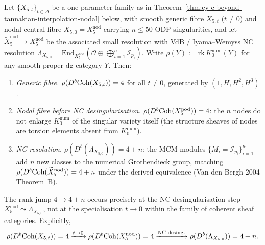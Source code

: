 \begin{proposition}
\label{prop:cy-c-beyond-k0-rank-jump-localisation}
Let $\{X_{5,t}\}_{t \in \Delta}$ be a one-parameter family as in
Theorem~\ref{thm:cy-c-beyond-tannakian-interpolation-nodal} below, with
smooth generic fibre $X_{5,t}$ ($t \neq 0$) and nodal central fibre
$X_{5,0} = X_5^{\mathrm{nod}}$ carrying $n \leq 50$ ODP singularities,
and let $\widetilde X_5^{\mathrm{nod}} \to X_5^{\mathrm{nod}}$ be the
associated small resolution with VdB / Iyama--Wemyss NC resolution
$\Lambda_{X_{5,0}} = \mathrm{End}_{X_5^{\mathrm{nod}}}(\mathcal O \oplus
\bigoplus_{i=1}^n \mathcal I_{p_i})$. Write $\rho(Y) :=
\mathrm{rk}\, K_0^{\mathrm{num}}(Y)$ for any smooth proper dg category
$Y$. Then:
\begin{enumerate}[label=\textup{(\roman*)}]
 \item \emph{Generic fibre.} $\rho(D^b\mathrm{Coh}(X_{5,t})) = 4$ for all
 $t \neq 0$, generated by $(1, H, H^2, H^3)$.
 \item \emph{Nodal fibre before NC desingularisation.}
 $\rho(D^b\mathrm{Coh}(X_5^{\mathrm{nod}})) = 4$: the $n$ nodes do not
 enlarge $K_0^{\mathrm{num}}$ of the singular variety itself
 (the structure sheaves of nodes are torsion elements absent
 from $K_0^{\mathrm{num}}$).
 \item \emph{NC resolution.} $\rho(D^b(\Lambda_{X_{5,0}})) = 4 + n$:
 the MCM modules $\{M_i = \mathcal I_{p_i}\}_{i=1}^n$ add $n$
 new classes to the numerical Grothendieck group, matching
 $\rho(D^b\mathrm{Coh}(\widetilde X_5^{\mathrm{nod}})) = 4 + n$ under
 the derived equivalence (Van den Bergh 2004 Theorem~B).
\end{enumerate}
The rank jump $4 \to 4+n$ occurs precisely at the NC-desingularisation
step $X_5^{\mathrm{nod}} \leadsto \Lambda_{X_{5,0}}$, not at the
specialisation $t \to 0$ within the family of coherent sheaf
categories. Explicitly,
\[
 \rho(D^b\mathrm{Coh}(X_{5,t})) = 4 \xrightarrow{t \to 0}
 \rho(D^b\mathrm{Coh}(X_5^{\mathrm{nod}})) = 4
 \xrightarrow{\text{NC desing.}}
 \rho(D^b(\Lambda_{X_{5,0}})) = 4 + n.
\]
\end{proposition}

